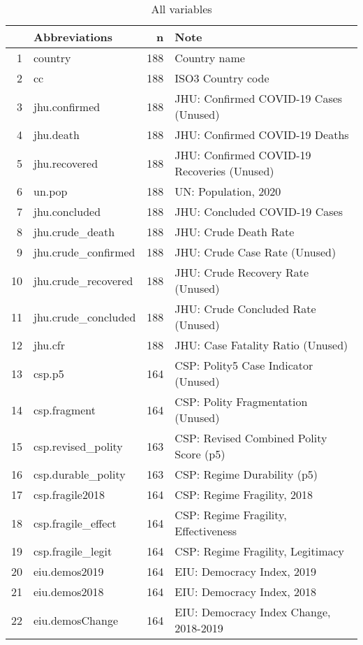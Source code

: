 \begingroup\scriptsize
\begin{longtable}{rlrl}
\caption{All variables} \\ 
  \hline
 & Abbreviations & n & Note \\ 
  \hline
1 & country & 188 & Country name \\ 
  2 & cc & 188 & ISO3 Country code \\ 
  3 & jhu.confirmed & 188 & JHU: Confirmed COVID-19 Cases (Unused) \\ 
  4 & jhu.death & 188 & JHU: Confirmed COVID-19 Deaths \\ 
  5 & jhu.recovered & 188 & JHU: Confirmed COVID-19 Recoveries (Unused) \\ 
  6 & un.pop & 188 & UN: Population, 2020 \\ 
  7 & jhu.concluded & 188 & JHU: Concluded COVID-19 Cases \\ 
  8 & jhu.crude\_death & 188 & JHU: Crude Death Rate \\ 
  9 & jhu.crude\_confirmed & 188 & JHU: Crude Case Rate (Unused) \\ 
  10 & jhu.crude\_recovered & 188 & JHU: Crude Recovery Rate (Unused) \\ 
  11 & jhu.crude\_concluded & 188 & JHU: Crude Concluded Rate (Unused) \\ 
  12 & jhu.cfr & 188 & JHU: Case Fatality Ratio (Unused) \\ 
  13 & csp.p5 & 164 & CSP: Polity5 Case Indicator (Unused) \\ 
  14 & csp.fragment & 164 & CSP: Polity Fragmentation (Unused) \\ 
  15 & csp.revised\_polity & 163 & CSP: Revised Combined Polity Score (p5) \\ 
  16 & csp.durable\_polity & 163 & CSP: Regime Durability (p5) \\ 
  17 & csp.fragile2018 & 164 & CSP: Regime Fragility, 2018 \\ 
  18 & csp.fragile\_effect & 164 & CSP: Regime Fragility, Effectiveness \\ 
  19 & csp.fragile\_legit & 164 & CSP: Regime Fragility, Legitimacy \\ 
  20 & eiu.demos2019 & 164 & EIU: Democracy Index, 2019 \\ 
  21 & eiu.demos2018 & 164 & EIU: Democracy Index, 2018 \\ 
  22 & eiu.demosChange & 164 & EIU: Democracy Index Change, 2018-2019 \\ 

\end{longtable}
